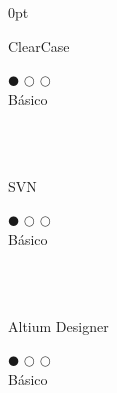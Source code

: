 \documentclass[a4paper]{article}
\begin{document}
\begin{adjustwidth}{\parindent}{0pt}
\begin{minipage}[t]{0.25\textwidth}
 \begin{minipage}{0.65\textwidth}
   \small{ClearCase}
 \end{minipage}
 \begin{minipage}{0.3\textwidth}
   \centering $\mdlgblkcircle$ $\mdlgwhtcircle$ $\mdlgwhtcircle$ \\  \footnotesize{Básico}
 \end{minipage} \\ \hspace{0pt} \\

 \begin{minipage}{0.65\textwidth}
   \small{SVN}
 \end{minipage}
 \begin{minipage}{0.3\textwidth}
   \centering $\mdlgblkcircle$ $\mdlgwhtcircle$ $\mdlgwhtcircle$ \\  \footnotesize{Básico}
 \end{minipage} \\ \hspace{0pt} \\
 
  \begin{minipage}{0.65\textwidth}
   \small{Altium Designer}
 \end{minipage}
 \begin{minipage}{0.3\textwidth}
   \centering $\mdlgblkcircle$ $\mdlgwhtcircle$ $\mdlgwhtcircle$ \\  \footnotesize{Básico}
 \end{minipage} \\ \hspace{0pt} \\

\end{minipage}
\end{adjustwidth}
\end{document}
